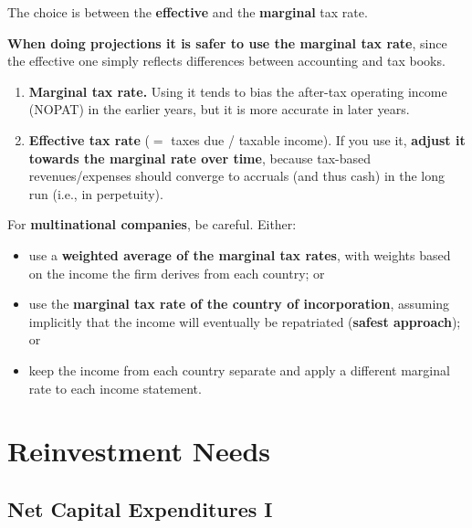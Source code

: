The choice is between the \textbf{effective} and the \textbf{marginal} tax rate.
\begin{keybox}[Rule]
\textbf{When doing projections it is safer to use the marginal tax rate}, since the effective one simply reflects differences between accounting and tax books.
\end{keybox}
\begin{enumerate}
  \item \textbf{Marginal tax rate.} Using it tends to bias the after-tax operating income (NOPAT) in the earlier years, but it is more accurate in later years.
  \item \textbf{Effective tax rate} ($=$ taxes due / taxable income). If you use it, \textbf{adjust it towards the marginal rate over time}, because tax-based revenues/expenses should converge to accruals (and thus cash) in the long run (i.e., in perpetuity).
\end{enumerate}
For \textbf{multinational companies}, be careful. Either:
\begin{itemize}
  \item use a \textbf{weighted average of the marginal tax rates}, with weights based on the income the firm derives from each country; or
  \item use the \textbf{marginal tax rate of the country of incorporation}, assuming implicitly that the income will eventually be repatriated (\textbf{safest approach}); or
  \item keep the income from each country separate and apply a different marginal rate to each income statement.
\end{itemize}

\section{Reinvestment Needs}

\subsection{Net Capital Expenditures I}

